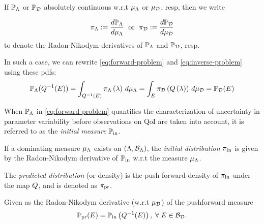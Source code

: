 \begin{frame}

\begin{defn}\label{defn:consistent-solution}
  If $\mathbb{P}_{\Lambda}$ or $\mathbb{P}_{\mathcal{D}}$ absolutely continuous w.r.t $\mu_{{\Lambda}}$ or $\mu_{\mathcal{D}}$, resp, then we write

  \begin{equation*}
    \pi_{\Lambda} := \frac{d\mathbb{P}_{\Lambda}}{d\mu_{{\Lambda}}} \;\text{ or }\; \pi_{\mathcal{D}} := \frac{d\mathbb{P}_{\mathcal{D}}}{d\mu_{\mathcal{D}}}
  \end{equation*}
  to denote the Radon-Nikodym derivatives of $\mathbb{P}_{\Lambda}$ and $\mathbb{P}_{\mathcal{D}}$, resp.
  \bigskip

  In such a case, we can rewrite \eqref{eq:forward-problem} and \eqref{eq:inverse-problem} using these pdfs:
  \begin{equation*}
  \mathbb{P}_{\Lambda} (Q^{-1}(E)) = \int_{Q^{-1}(E)} \pi_{\Lambda} \left ( \lambda \right ) \, d\mu_{{\Lambda}} = \int_E \pi_{\mathcal{D}} \left ( Q\left ( \lambda \right ) \right ) \, d\mu_{\mathcal{D}} = \mathbb{P}_{\mathcal{D}}(E)
  \end{equation*}

\end{defn}

\end{frame}


\begin{frame}

\begin{defn}\label{defn:initial}
  When $\mathbb{P}_{\Lambda}$ in \eqref{eq:forward-problem} quantifies the characterization of uncertainty in parameter variability before observations on QoI are taken into account, it is referred to as the \emph{initial measure} $\operatorname*{\mathbb{P}_{in}}$.

  \bigskip
  If a dominating measure $\mu_{\Lambda}$ exists on $({\Lambda}, \mathcal{B}_{{\Lambda}})$, the \emph{initial distribution} $\operatorname*{\pi_{in}}$ is given by the Radon-Nikodym derivative of $\operatorname*{\mathbb{P}_{in}}$ w.r.t the measure $\mu_{{\Lambda}}$.
\end{defn}

\end{frame}


\begin{frame}
\begin{defn}\label{defn:predicted}
 The \emph{predicted distribution} (or density) is the push-forward density of $\operatorname*{\pi_{in}}$ under the map $Q$, and is denoted as $\operatorname*{\pi_{pr}}$.

  Given as the Radon-Nikodym derivative (w.r.t $\mu_{\mathcal{D}}$) of the pushforward measure
 \begin{equation}\label{eq:predicted}
    \operatorname*{\mathbb{P}_{pr}} (E) = \operatorname*{\mathbb{P}_{in}} \left ( Q^{-1}(E) \right ), \; \forall \; E \in \mathcal{B}_{\mathcal{D}}.
  \end{equation}
\end{defn}


\end{frame}


